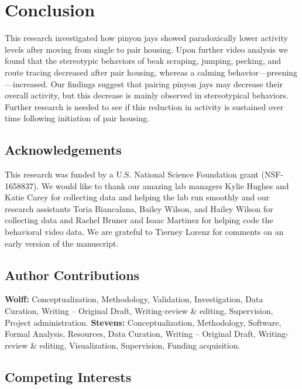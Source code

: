 \documentclass[
  pub]{apa6}
\begin{document}
\hypertarget{conclusion}{%
\section{Conclusion}\label{conclusion}}

This research investigated how pinyon jays showed paradoxically lower activity levels after moving from single to pair housing. Upon further video analysis we found that the stereotypic behaviors of beak scraping, jumping, pecking, and route tracing decreased after pair housing, whereas a calming behavior---preening---increased. Our findings suggest that pairing pinyon jays may decrease their overall activity, but this decrease is mainly observed in stereotypical behaviors. Further research is needed to see if this reduction in activity is sustained over time following initiation of pair housing.

\hypertarget{acknowledgements}{%
\subsection{Acknowledgements}\label{acknowledgements}}

This research was funded by a U.S. National Science Foundation grant (NSF-1658837). We would like to thank our amazing lab managers Kylie Hughes and Katie Carey for collecting data and helping the lab run smoothly and our research assistants Toria Biancalana, Bailey Wilson, and Hailey Wilson for collecting data and Rachel Bruner and Isaac Martinez for helping code the behavioral video data. We are grateful to Tierney Lorenz for comments on an early version of the manuscript.

\hypertarget{author-contributions}{%
\subsection{Author Contributions}\label{author-contributions}}

\textbf{Wolff:} Conceptualization, Methodology, Validation, Investigation, Data Curation, Writing -- Original Draft, Writing-review \& editing, Supervision, Project administration. \textbf{Stevens:} Conceptualization, Methodology, Software, Formal Analysis, Resources, Data Curation, Writing -- Original Draft, Writing-review \& editing, Visualization, Supervision, Funding acquisition.

\hypertarget{competing-interests}{%
\subsection{Competing Interests}\label{competing-interests}}
\end{document}
